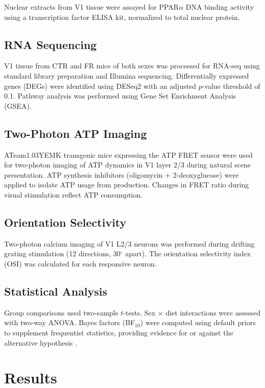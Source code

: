 \documentclass[11pt]{article}
\begin{document}
Nuclear extracts from V1 tissue were assayed for PPAR$\alpha$ DNA binding activity using a transcription factor ELISA kit, normalized to total nuclear protein.

\subsection{RNA Sequencing}

V1 tissue from CTR and FR mice of both sexes was processed for RNA-seq using standard library preparation and Illumina sequencing. Differentially expressed genes (DEGs) were identified using DESeq2 with an adjusted $p$-value threshold of 0.1. Pathway analysis was performed using Gene Set Enrichment Analysis (GSEA).

\subsection{Two-Photon ATP Imaging}

ATeam1.03YEMK transgenic mice expressing the ATP FRET sensor were used for two-photon imaging of ATP dynamics in V1 layer 2/3 during natural scene presentation. ATP synthesis inhibitors (oligomycin + 2-deoxyglucose) were applied to isolate ATP usage from production. Changes in FRET ratio during visual stimulation reflect ATP consumption.

\subsection{Orientation Selectivity}

Two-photon calcium imaging of V1 L2/3 neurons was performed during drifting grating stimulation (12 directions, 30$^{\circ}$ apart). The orientation selectivity index (OSI) was calculated for each responsive neuron.

\subsection{Statistical Analysis}

Group comparisons used two-sample $t$-tests. Sex $\times$ diet interactions were assessed with two-way ANOVA. Bayes factors (BF$_{10}$) were computed using default priors to supplement frequentist statistics, providing evidence for or against the alternative hypothesis \citep{rouder2009}.

\section{Results}
\end{document}
